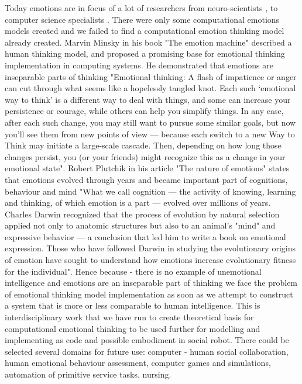 Today emotions are in focus of a lot of researchers from neuro-scientists \cite{emotionsbraintorobot, parsingreward, neuromodulatory, cubeofemotions}, to computer science specialists \cite{emotionandsociable, senticcomputing, hourglass, affectivemodelofinterplay, affectivecomputing, affectivecomputingchallanges}.
There were only some computational emotions models created \cite{computationalmodelsemotion, computationalmodelsemotionscognition, evaluatingcomutationalmodel, threelevel} and we failed to find a computational emotion thinking model already created. Marvin Minsky in his book "The emotion machine" \cite{emotionmachine} described a human thinking model, and proposed a promising base for emotional thinking implementation in computing systems. He demonstrated that emotions are inseparable parts of thinking "Emotional thinking: A flash of impatience or anger can cut through what seems like a hopelessly tangled knot. Each such ‘emotional way to think' is a different way to deal with things, and some can increase your persistence or courage, while others can help you simplify things.
In any case, after each such change, you may still want to pursue some similar goals, but now you’ll see them from new points of view — because each switch to a new Way to Think may initiate a large-scale cascade. Then, depending on how long those changes persist, you (or your friends) might recognize this as a change in your emotional state". Robert Plutchik in his article "The nature of emotions" \cite{natureofemotions} states that emotions evolved through years and became important part of cognitions, behaviour and mind "What we call cognition — the activity of knowing, learning and thinking, of which emotion is a part — evolved over millions of years. Charles Darwin recognized that the process of evolution by natural selection applied not only to anatomic structures but also to an animal's "mind" and expressive behavior — a conclusion that led him to write a book on emotional expression. Those who have followed Darwin in studying the evolutionary origins of emotion have sought to understand how emotions increase evolutionary fitness for the individual". Hence because - there is no example of unemotional intelligence and emotions are an inseparable part of thinking we face the problem of emotional thinking model implementation as soon as we attempt to construct a system that is more or less comparable to human intelligence. This is interdisciplinary work that we have run to create theoretical basis for computational emotional thinking to be used further for modelling and implementing as code and possible embodiment in social robot. There could be selected several domains for future use: computer - human social collaboration, human emotional behaviour assessment, computer games and simulations, automation of primitive service tasks, nursing.

